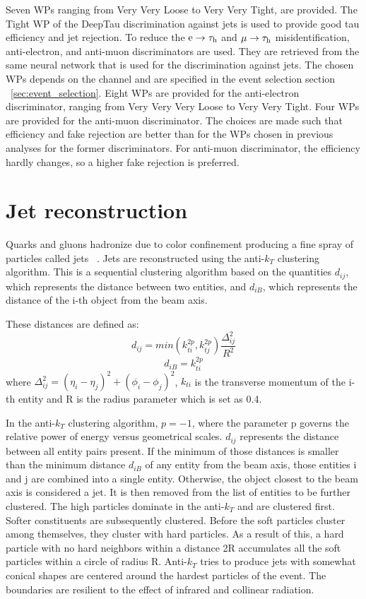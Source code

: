 Seven WPs ranging from Very Very Loose to Very Very Tight, are provided. The Tight \tauh WP of the DeepTau discrimination against jets is used to provide good tau efficiency and jet rejection. To reduce the $\text{e}\to\tau_{\text{h}}$ and $\mu\to\tau_{\text{h}}$ misidentification, anti-electron, and anti-muon discriminators are used. They are retrieved from the same neural network that is used for the discrimination against jets. The chosen WPs depends on the channel and are specified in the event selection section ~\ref{sec:event_selection}. Eight WPs are provided for the anti-electron discriminator, ranging from Very Very Very Loose to Very Very Tight. Four WPs are provided for the anti-muon discriminator. The choices are made such that efficiency and fake rejection are better than for the WPs chosen in previous analyses for the former discriminators. For anti-muon discriminator, the efficiency hardly changes, so a higher fake rejection is preferred.

\section{Jet reconstruction}
\label{jet_recon}

Quarks and gluons hadronize due to color confinement producing a fine spray of particles called jets ~\cite{Cacciari:2008gp}. Jets are reconstructed using the anti-$k_{T}$ clustering algorithm. This is a sequential clustering algorithm based on the quantities $d_{ij}$, which represents the distance between two entities, and $d_{iB}$, which represents the distance of the i-th object from the beam axis.

These distances are defined as:
\begin{equation}
  d_{ij}=min(k_{ti}^{2p},k_{tj}^{2p})\frac{\Delta_{ij}^{2}}{R^2}
\end{equation}
\begin{equation}
  d_{iB}=k_{ti}^{2p}
\end{equation}
where $\Delta_{ij}^{2}=(\eta_i-\eta_j)^2+(\phi_i-\phi_j)^2$, $k_{ti}$ is the transverse momentum of the i-th entity and R is the radius parameter which is set as 0.4.

In the anti-$k_{T}$ clustering algorithm, $p=-1$, where the parameter p governs the relative power of energy versus geometrical scales. $d_{ij}$ represents the distance between all entity pairs present. If the minimum of those distances is smaller than the minimum distance $d_{iB}$ of any entity from the beam axis, those entities i and j are combined into a single entity. Otherwise, the object closest to the beam axis is considered a jet. It is then removed from the list of entities to be further clustered. The high \pt particles dominate in the anti-$k_{T}$ and are clustered first. Softer constituents are subsequently clustered. Before the soft particles cluster among themselves, they cluster with hard particles. As a result of this, a hard particle with no hard neighbors within a distance 2R accumulates all the soft particles within a circle of radius R. Anti-$k_{T}$ tries to produce jets with somewhat conical shapes are centered around the hardest particles of the event. The boundaries are resilient to the effect of infrared and collinear radiation.

